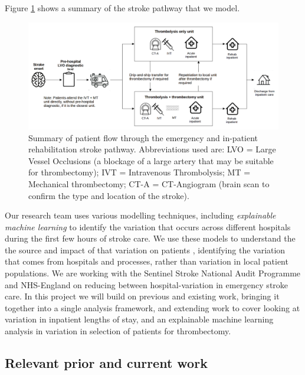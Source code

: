 Figure \ref{fig:flow} shows a summary of the stroke pathway that we model.

\begin{figure}[h!]
\centering
\includegraphics[width=1.0\textwidth]{./images/pathway}
\caption{Summary of patient flow through the emergency and in-patient rehabilitation stroke pathway. Abbreviations used are: LVO = Large Vessel Occlusions (a blockage of a large artery that may be suitable for thrombectomy); IVT = Intravenous Thrombolysis; MT = Mechanical thrombectomy; CT-A = CT-Angiogram (brain scan to confirm the type and location of the stroke).}
\label{fig:flow}
\end{figure}

Our research team uses various modelling techniques, including \textit{explainable machine learning} to identify the variation that occurs across different hospitals during the first few hours of stroke care. We use these models to understand the the source and impact of that variation on patients \cite{allen_using_2022, allen_use_2022}, identifying the variation that comes from hospitals and processes, rather than variation in local patient populations. We are working with the Sentinel Stroke National Audit Programme and NHS-England on reducing between hospital-variation in emergency stroke care. In this project we will build on previous and existing work, bringing it together into a single analysis framework, and extending work to cover looking at variation in inpatient lengths of stay, and an explainable machine learning analysis in variation in selection of patients for thrombectomy.

\subsection*{Relevant prior and current work}

